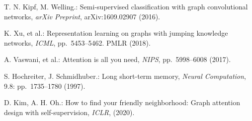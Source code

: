 \documentclass[a4j,twocolumn]{jsarticle}
\begin{document}


\renewcommand{\bibname}{参考文献}
\begin{thebibliography}{1}
\vspace{-2mm}

T. N. Kipf, M. Welling.:
Semi-supervised classification with graph convolutional networks,
{\it arXiv Preprint}, arXiv:1609.02907 (2016).
\vspace{-0.3mm}

K. Xu, et al.:
Representation learning on graphs with jumping knowledge networks,
{\it ICML}, pp.~5453--5462. PMLR (2018).
\vspace{-0.3mm}

A. Vaswani, et al.:
Attention is all you need,
{\it NIPS}, pp.~5998--6008 (2017).
\vspace{-0.3mm}

S. Hochreiter, J. Schmidhuber.:
Long short-term memory,
{\it Neural Computation}, 9.8: pp.~1735--1780 (1997).
\vspace{-0.3mm}

D. Kim, A. H. Oh.:
How to find your friendly neighborhood: Graph attention design with self-supervision,
{\it ICLR}, (2020).
\vspace{-0.3mm}

\end{thebibliography}
\end{document}
